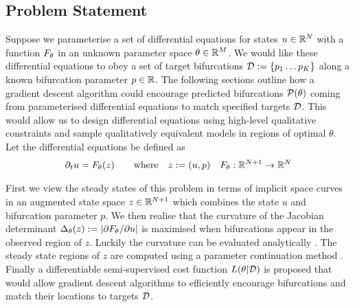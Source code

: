 \subsection{Problem Statement}
Suppose we parameterise a set of differential equations for states $u\in\mathbb{R}^N$ with a function $F_{\theta}$ in an unknown parameter space $\theta\in\mathbb{R}^M$. We would like these differential equations to obey a set of target bifurcations $\mathcal{D}:=\{p_1\dots p_K\}$ along a known bifurcation parameter $p\in\mathbb{R}$. The following sections outline how a gradient descent algorithm could encourage predicted bifurcations $\mathcal{P}(\theta)$ coming from parameterised differential equations to match specified targets $\mathcal{D}$. This would allow us to design differential equations using high-level qualitative constraints and sample qualitatively equivalent models in regions of optimal $\theta$. Let the differential equations be defined as
\begin{align}
	\partial_t u=F_{\theta}(z)
	\qquad\mathrm{where}\quad z:=(u,p)\quad
	F_{\theta} : \mathbb{R}^{N+1}\rightarrow\mathbb{R}^N
	\label{eq:model}
\end{align}

First we view the steady states of this problem in terms of implicit space curves \cite{Goldman2005CurvatureSurfaces} in an augmented state space $z\in\mathbb{R}^{N+1}$ which combines the state $u$ and bifurcation parameter $p$. We then realise that the curvature of the Jacobian determinant $\Delta_{\theta}(z):=|\partial F_{\theta}/\partial u|$ is maximised when bifurcations appear in the observed region of $z$. Luckily the curvature can be evaluated analytically \cite{Goldman2005CurvatureSurfaces}. The steady state regions of $z$ are computed using a parameter continuation method \cite{Veltz2019PseudoArcLengthContinuation.jl,Farrell2016TheDiagrams}. Finally a differentiable semi-supervised cost function $L(\theta|\mathcal{D})$ is proposed that would allow gradient descent algorithms to efficiently encourage bifurcations and match their locations to targets $\mathcal{D}$.

